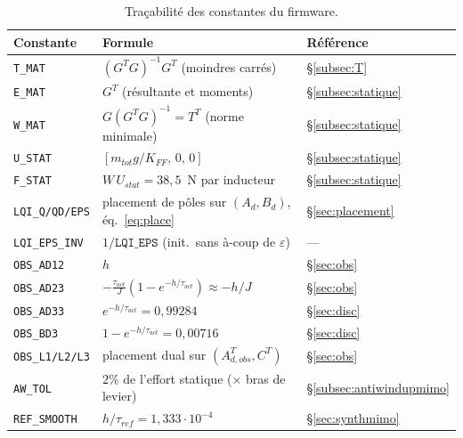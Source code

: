 \documentclass[a4paper,11pt]{article}
\newcommand{\e}[1]{\cdot 10^{#1}}
\begin{document}
\begin{table}[h]
    \centering
    \renewcommand{\arraystretch}{1.25}
    \begin{tabular}{lll}
        \toprule
        Constante & Formule & Référence \\
        \midrule
        \texttt{T\_MAT}    & $(G^TG)^{-1}G^T$ (moindres carrés)        & §\ref{subsec:T} \\
        \texttt{E\_MAT}    & $G^T$ (résultante et moments)             & §\ref{subsec:statique} \\
        \texttt{W\_MAT}    & $G(G^TG)^{-1} = T^T$ (norme minimale)     & §\ref{subsec:statique} \\
        \texttt{U\_STAT}   & $[m_{tot}g/K_{FF},\,0,\,0]$               & §\ref{subsec:statique} \\
        \texttt{F\_STAT}   & $W\,U_{stat} = 38{,}5$~N par inducteur    & §\ref{subsec:statique} \\
        \texttt{LQI\_Q/QD/EPS} & placement de pôles sur $(A_d, B_d)$, éq.~\eqref{eq:place} & §\ref{sec:placement} \\
        \texttt{LQI\_EPS\_INV} & $1/\texttt{LQI\_EPS}$ (init.\ sans à-coup de $\varepsilon$) & --- \\
        \texttt{OBS\_AD12} & $h$                                        & §\ref{sec:obs} \\
        \texttt{OBS\_AD23} & $-\tfrac{\tau_{act}}{J}(1-e^{-h/\tau_{act}}) \approx -h/J$ & §\ref{sec:obs} \\
        \texttt{OBS\_AD33} & $e^{-h/\tau_{act}} = 0{,}99284$            & §\ref{sec:disc} \\
        \texttt{OBS\_BD3}  & $1-e^{-h/\tau_{act}} = 0{,}00716$          & §\ref{sec:disc} \\
        \texttt{OBS\_L1/L2/L3} & placement dual sur $(A_{d,obs}^T, C^T)$ & §\ref{sec:obs} \\
        \texttt{AW\_TOL}   & $2\%$ de l'effort statique ($\times$ bras de levier) & §\ref{subsec:antiwindupmimo} \\
        \texttt{REF\_SMOOTH} & $h/\tau_{ref} = 1{,}333\e{-4}$           & §\ref{sec:synthmimo} \\
        \bottomrule
    \end{tabular}
    \caption{Traçabilité des constantes du firmware.}
\end{table}
\end{document}
